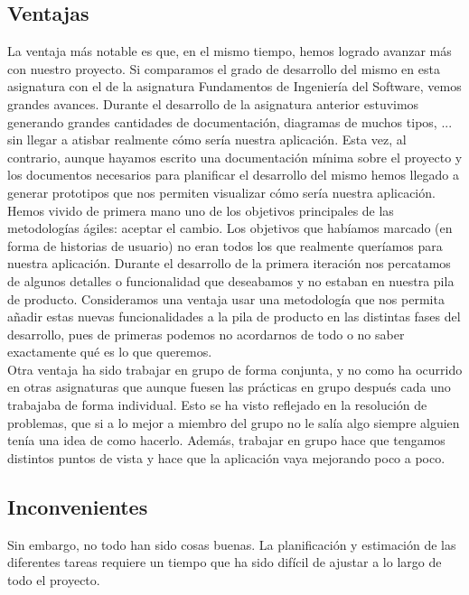 \documentclass[11pt]{article}
\begin{document}
\subsection*{Ventajas}
La ventaja más notable es que, en el mismo tiempo, hemos logrado avanzar más con nuestro proyecto. Si comparamos el grado de desarrollo del mismo en esta asignatura con el de la asignatura Fundamentos de Ingeniería del Software, vemos grandes avances. Durante el desarrollo de la asignatura anterior estuvimos generando grandes cantidades de documentación, diagramas de muchos tipos, ... sin llegar a atisbar realmente cómo sería nuestra aplicación. Esta vez, al contrario, aunque hayamos escrito una documentación mínima sobre el proyecto y los documentos necesarios para planificar el desarrollo del mismo hemos llegado a generar prototipos que nos permiten visualizar cómo sería nuestra aplicación.\\

Hemos vivido de primera mano uno de los objetivos principales de las metodologías ágiles: aceptar el cambio. Los objetivos que habíamos marcado (en forma de historias de usuario) no eran todos los que realmente queríamos para nuestra aplicación. Durante el desarrollo de la primera iteración nos percatamos de algunos detalles o funcionalidad que deseabamos y no estaban en nuestra pila de producto. Consideramos una ventaja usar una metodología que nos permita añadir estas nuevas funcionalidades a la pila de producto en las distintas fases del desarrollo, pues de primeras podemos no acordarnos de todo o no saber exactamente qué es lo que queremos.\\

Otra ventaja ha sido trabajar en grupo de forma conjunta, y no como ha ocurrido en otras asignaturas que aunque fuesen las prácticas en grupo después cada uno trabajaba de forma individual. Esto se ha visto reflejado en la resolución de problemas, que si a lo mejor a miembro del grupo no le salía algo siempre alguien tenía una idea de como hacerlo. Además, trabajar en grupo hace que tengamos distintos puntos de vista y hace que la aplicación vaya mejorando poco a poco.

\subsection*{Inconvenientes}

Sin embargo, no todo han sido cosas buenas. La planificación y estimación de las diferentes tareas requiere un tiempo que ha sido difícil de ajustar a lo largo de todo el proyecto. 
\end{document}
